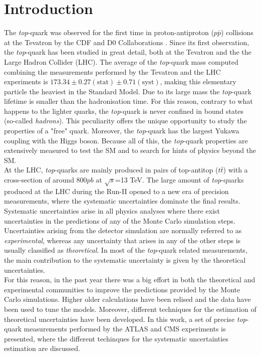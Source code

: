\documentclass[12pt]{article}
\begin{document}
\section{Introduction}
The \emph{top}-quark was observed for the first time in proton-antiproton ($p\bar{p}$) collisions at the Tevatron by the CDF and D0 Collaborations %
\cite{Abe_1995,Abachi_1995}. Since its first observation, the \emph{top}-quark has been studied in great detail, both at the Tevatron and the the Large Hadron Collider (LHC). The average of the \emph{top}-quark mass computed combining the measurements performed by the Tevatron and the LHC experiments \cite{atlas2014combination} is $173.34\pm0.27(\text{stat})\pm0.71(\text{syst})$, making this elementary particle the heaviest in the Standard Model. 
Due to its large mass the \emph{top}-quark lifetime is smaller than the hadronisation time. For this reason, contrary to what happens to the lighter quarks, the \emph{top}-quark is never confined in bound states (so-called \emph{hadrons}). This peculiarity offers the unique opportunity to study the properties of a "free" quark.
Moreover, the \emph{top}-quark has the largest Yukawa coupling with the Higgs boson. Because all of this, the \emph{top}-quark properties are extensively measured to test the SM and to search for hints of physics beyond the SM.\\ 
At the LHC, \emph{top}-quarks are mainly produced in pairs of top-antitop ($t\bar{t}$) with a cross-section of around 800$pb$ at $\sqrt{s}$=13 TeV.
The large amount of \emph{top}-quarks produced at the LHC during the Run-II opened to a new era of precision measurements, where the systematic uncertainties dominate the final results. Systematic uncertainties arise in all physics analyses where there exist uncertainties in the predictions of any of the Monte Carlo simulation steps. Uncertainties arising from the detector simulation are normally referred to as \emph{experimental}, whereas any uncertainty that arises in any of the other steps is usually classified as \emph{theoretical}. In most of the \emph{top}-quark related measurements, the main contribution to the systematic uncertainty is given by the theoretical uncertainties.\\
For this reason, in the past year there was a big effort in both the theoretical and experimental communities to improve the predictions provided by the Monte Carlo simulations. Higher older calculations have been relised and the data have been used to tune the models.
Moreover, different techniques for the estimation of theoretical uncertainties have been developed. In this work, a set of precise \emph{top}-quark measurements performed by the ATLAS and CMS experiments is presented, where the different techinques for the systematic uncertainties estimation are discussed.
\end{document}
